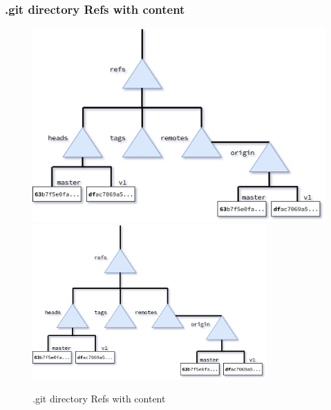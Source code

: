\begin{frame}[fragile]
    \frametitle{.git directory Refs with content}
    \begin{figure}
        \begin{center}
            {
                \includegraphics[height=0.75\textheight,keepaspectratio]{./images/gitDirectory-Refs_Content.png}
            }
            {
                \includegraphics[height=0.75\textheight,width=0.8\textwidth]{./images/gitDirectory-Refs_Content.png}
            }
            \caption{.git directory Refs with content}
        \end{center}
    \end{figure}
\end{frame}

